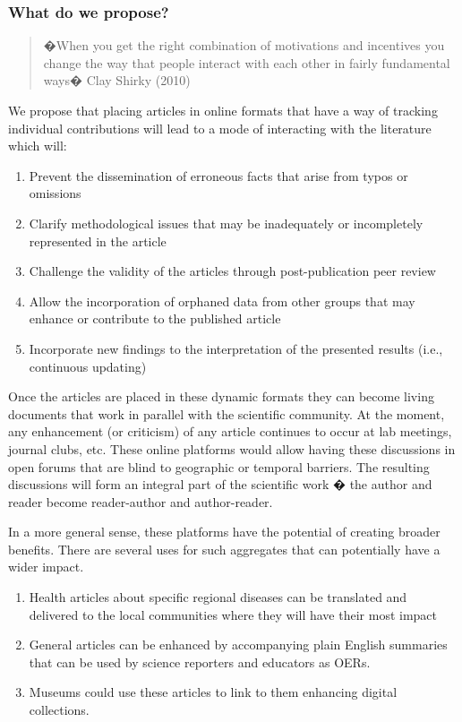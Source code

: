 \documentclass[final,authoryear,3p]{elsarticle-open-drafting}
\begin{document}
\subsubsection{What do we propose?}

\begin{quote}
�When you get the right combination of motivations and incentives you change the way that people interact with each other in fairly fundamental ways� Clay Shirky (2010)
\end{quote}

We propose that placing articles in online formats that have a way of tracking individual contributions will lead to a mode of interacting with the literature which will:

\begin{enumerate}
	\item Prevent the dissemination of erroneous facts that arise from typos or omissions
	\item Clarify methodological issues that may be inadequately or incompletely represented in the article
	\item Challenge the validity of the articles through post-publication peer review
	\item Allow the incorporation of orphaned data from other groups that may enhance or contribute to the published article
	\item Incorporate new findings to the interpretation of the presented results (i.e., continuous updating)
\end{enumerate}

Once the articles are placed in these dynamic formats they can become living documents that work in parallel with the scientific community. At the moment, any enhancement (or criticism) of any article continues to occur at lab meetings, 
journal clubs, etc. These online platforms would allow having these discussions in open forums that are blind to geographic 
or temporal barriers. The resulting discussions will form an integral part of the scientific work � the author and reader
 become reader-author and author-reader.

In a more general sense, these platforms have the potential of creating broader benefits. There are several uses for such aggregates that can potentially have a wider impact. 

\begin{enumerate}
\item Health articles about specific regional diseases can be translated and delivered to the local communities where they 
will have their most impact
\item General articles can be enhanced by accompanying plain English summaries that can be used by science reporters 
and educators as OERs. 
\item Museums could use these articles to link to them enhancing digital collections. 
\end{enumerate}
\end{document}

